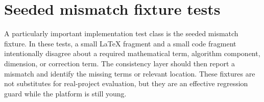 \section{Seeded mismatch fixture tests}

A particularly important implementation test class is the seeded mismatch fixture. In these tests, a small LaTeX fragment and a small code fragment intentionally disagree about a required mathematical term, algorithm component, dimension, or correction term. The consistency layer should then report a mismatch and identify the missing terms or relevant location. These fixtures are not substitutes for real-project evaluation, but they are an effective regression guard while the platform is still young.
